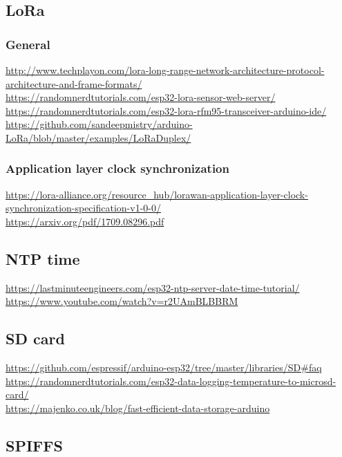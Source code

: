 \documentclass[11pt,a4paper]{article}
\begin{document}
\subsection{LoRa}


\subsubsection{General}

\url{http://www.techplayon.com/lora-long-range-network-architecture-protocol-architecture-and-frame-formats/}\\[4pt]
\url{https://randomnerdtutorials.com/esp32-lora-sensor-web-server/}\\[4pt]
\url{https://randomnerdtutorials.com/esp32-lora-rfm95-transceiver-arduino-ide/}\\[4pt]
\url{https://github.com/sandeepmistry/arduino-LoRa/blob/master/examples/LoRaDuplex/}

\subsubsection{Application layer clock synchronization}

\url{https://lora-alliance.org/resource_hub/lorawan-application-layer-clock-synchronization-specification-v1-0-0/}\\[4pt]
\url{https://arxiv.org/pdf/1709.08296.pdf}


\subsection{NTP time}


\url{https://lastminuteengineers.com/esp32-ntp-server-date-time-tutorial/}\\[4pt]
\url{https://www.youtube.com/watch?v=r2UAmBLBBRM}


\subsection{SD card}


\url{https://github.com/espressif/arduino-esp32/tree/master/libraries/SD#faq}\\[4pt]
\url{https://randomnerdtutorials.com/esp32-data-logging-temperature-to-microsd-card/}\\[4pt]
\url{https://majenko.co.uk/blog/fast-efficient-data-storage-arduino}


\subsection{SPIFFS}
\end{document}
